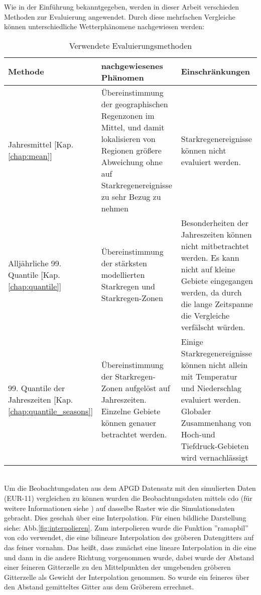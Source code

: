 Wie in der Einführung bekanntgegeben, werden in dieser Arbeit verschieden Methoden zur Evaluierung angewendet. Durch diese mehrfachen Vergleiche können unterschiedliche Wetterphänomene nachgewiesen werden:\\
\begin{table}[h!]
	\begin{tabularx}{\textwidth}{|X|X|X|}
		\hline
		\textbf{Methode} & \textbf{nachgewiesenes Phänomen}& \textbf{Einschränkungen}\\
		\hline
		Jahresmittel [Kap. \ref{chap:mean}] & Übereinstimmung der geographischen Regenzonen im Mittel, und damit lokalisieren von Regionen größere Abweichung ohne auf Starkregenereignisse zu sehr Bezug zu nehmen & Starkregenereignisse können nicht evaluiert werden.\\
		\hline
		Alljährliche 99. Quantile [Kap. \ref{chap:quantile}] & Übereinstimmung der stärksten modellierten Starkregen und Starkregen-Zonen & Besonderheiten der Jahreszeiten können nicht mitbetrachtet werden. Es kann nicht auf kleine Gebiete eingegangen werden, da durch die lange Zeitspanne die Vergleiche verfälscht würden.\\
		\hline
		99. Quantile der Jahreszeiten [Kap. \ref{chap:quantile_seasons}] & Übereinstimmung der Starkregen-Zonen aufgelöst auf Jahreszeiten. Einzelne Gebiete können genauer betrachtet werden. & Einige Starkregenereignisse können nicht allein mit Temperatur und Niederschlag evaluiert werden. Globaler Zusammenhang von Hoch-und Tiefdruck-Gebieten wird vernachlässigt\\
		\hline
	\end{tabularx}
\caption{Verwendete Evaluierungsmethoden}
\end{table}
\hfill\\
Um die Beobachtungsdaten aus dem APGD\cite{meteoswiss} Datensatz mit den simulierten Daten (EUR-11) vergleichen zu können wurden die Beobachtungsdaten mittels cdo (für weitere Informationen siehe \cite{cdo}) auf dasselbe Raster wie die Simulationsdaten gebracht. Dies geschah über eine Interpolation. Für einen bildliche Darstellung siehe: Abb.\ref{fig:interpolieren}. Zum interpolieren wurde die Funktion ''ramapbil'' von cdo verwendet, die eine bilineare Interpolation des gröberen Datengitters auf das feiner vornahm. Das heißt, dass zunächst eine lineare Interpolation in die eine und dann in die andere Richtung vorgenommen wurde, dabei wurde der Abstand einer feineren Gitterzelle zu den Mittelpunkten der umgebenden gröberen Gitterzelle als Gewicht der Interpolation genommen. So wurde ein feineres über den Abstand gemitteltes Gitter aus dem Gröberem errechnet.\\
